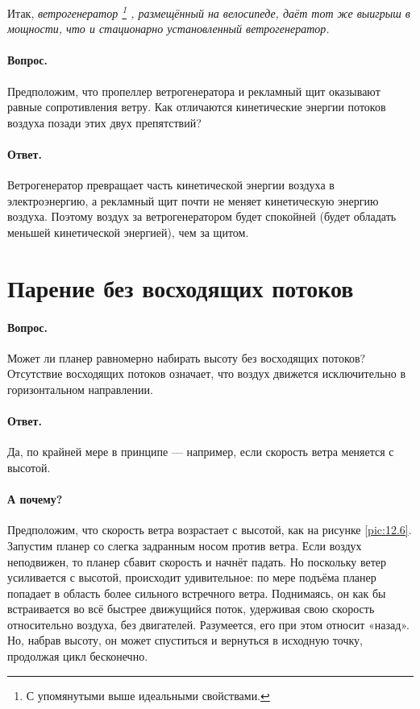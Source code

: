 Итак, \emph{ветрогенератор%
\footnote{С упомянутыми выше идеальными свойствами.}%
, размещённый на велосипеде, даёт тот же выигрыш в мощности, что и стационарно установленный ветрогенератор.}

\paragraph{Вопрос.} Предположим, что пропеллер ветрогенератора и рекламный щит оказывают равные сопротивления ветру.
Как отличаются кинетические энергии потоков воздуха позади этих двух препятствий?

\paragraph{Ответ.}
Ветрогенератор превращает часть кинетической энергии воздуха в электроэнергию,
а рекламный щит почти не меняет кинетическую энергию воздуха.
Поэтому воздух за ветрогенератором будет спокойней (будет обладать меньшей кинетической энергией), чем за щитом.

\section{Парение без восходящих потоков}

\paragraph{Вопрос.}
Может ли планер равномерно набирать высоту без восходящих потоков?
Отсутствие восходящих потоков означает, что воздух движется исключительно в горизонтальном направлении.

\paragraph{Ответ.}
Да, по крайней мере в принципе --- например, если скорость ветра меняется с высотой.

\paragraph{А почему?}
Предположим, что скорость ветра возрастает с высотой, как на рисунке \ref{pic:12.6}.
Запустим планер со слегка задранным носом против ветра.
Если воздух неподвижен, то планер сбавит скорость и начнёт падать.
Но поскольку ветер усиливается с высотой, происходит удивительное: по мере подъёма планер попадает в область более сильного встречного ветра.
Поднимаясь, он как бы встраивается во всё быстрее движущийся поток, удерживая свою скорость относительно воздуха, без двигателей.
Разумеется, его при этом относит «назад».
Но, набрав высоту, он может спуститься и вернуться в исходную точку, продолжая цикл бесконечно.

